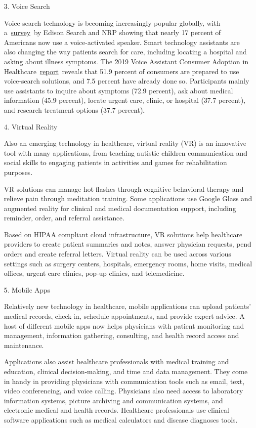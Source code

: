 \documentclass[
]{article}
\begin{document}
3. Voice Search

Voice search technology is becoming increasingly popular globally, with
a~\href{https://www.npr.org/about-npr/577007267/jan-2018-smart-audio-report}{survey}~by
Edison Search and NRP showing that nearly 17 percent of Americans now
use a voice-activated speaker. Smart technology assistants are also
changing the way patients search for care, including locating a hospital
and asking about illness symptoms. The 2019 Voice Assistant Consumer
Adoption in
Healthcare~\href{https://voicebot.ai/wp-content/uploads/2019/10/voice_assistant_consumer_adoption_in_healthcare_report_voicebot.pdf}{report}~reveals
that 51.9 percent of consumers are prepared to use voice-search
solutions, and 7.5 percent have already done so. Participants mainly use
assistants to inquire about symptoms (72.9 percent), ask about medical
information (45.9 percent), locate urgent care, clinic, or hospital
(37.7 percent), and research treatment options (37.7 percent).~

4. Virtual Reality

Also an emerging technology in healthcare, virtual reality (VR) is an
innovative tool with many applications, from teaching autistic children
communication and social skills to engaging patients in activities and
games for rehabilitation purposes.~

VR solutions can manage hot flashes through cognitive behavioral therapy
and relieve pain through meditation training. Some applications use
Google Glass and augmented reality for clinical and medical
documentation support, including reminder, order, and referral
assistance.~

Based on HIPAA compliant cloud infrastructure, VR solutions help
healthcare providers to create patient summaries and notes, answer
physician requests, pend orders and create referral letters. Virtual
reality can be used across various settings such as surgery centers,
hospitals, emergency rooms, home visits, medical offices, urgent care
clinics, pop-up clinics, and telemedicine.~

5. Mobile Apps

Relatively new technology in healthcare, mobile applications can upload
patients' medical records, check in, schedule appointments, and provide
expert advice. A host of different mobile apps now helps physicians with
patient monitoring and management, information gathering, consulting,
and health record access and maintenance.~

Applications also assist healthcare professionals with medical training
and education, clinical decision-making, and time and data management.
They come in handy in providing physicians with communication tools such
as email, text, video conferencing, and voice calling. Physicians also
need access to laboratory information systems, picture archiving and
communication systems, and electronic medical and health records.
Healthcare professionals use clinical software applications such as
medical calculators and disease diagnoses tools.
\end{document}
